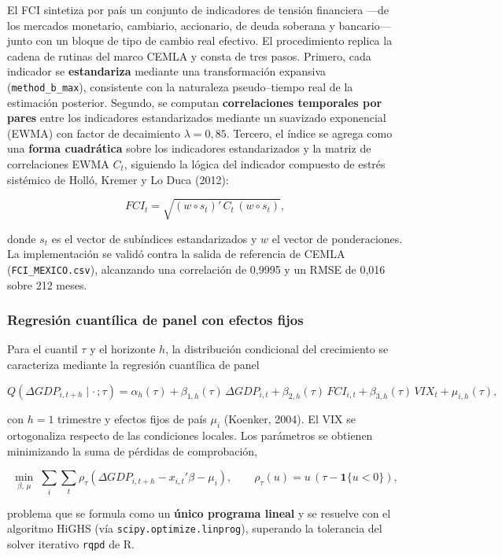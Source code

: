 \documentclass[5p,times,twocolumn,authoryear]{elsarticle}
\begin{document}
El FCI sintetiza por país un conjunto de indicadores de tensión financiera —de los mercados monetario, cambiario, accionario, de deuda soberana y bancario— junto con un bloque de tipo de cambio real efectivo. El procedimiento replica la cadena de rutinas del marco CEMLA y consta de tres pasos. Primero, cada indicador se \textbf{estandariza} mediante una transformación expansiva (\texttt{method\_b\_max}), consistente con la naturaleza pseudo–tiempo real de la estimación posterior. Segundo, se computan \textbf{correlaciones temporales por pares} entre los indicadores estandarizados mediante un suavizado exponencial (EWMA) con factor de decaimiento $\lambda = 0{,}85$. Tercero, el índice se agrega como una \textbf{forma cuadrática} sobre los indicadores estandarizados y la matriz de correlaciones EWMA $C_t$, siguiendo la lógica del indicador compuesto de estrés sistémico de Holló, Kremer y Lo Duca (2012):

\[ FCI_t = \sqrt{(w \circ s_t)'\,C_t\,(w \circ s_t)}, \]

donde $s_t$ es el vector de subíndices estandarizados y $w$ el vector de ponderaciones. La implementación se validó contra la salida de referencia de CEMLA (\texttt{FCI\_MEXICO.csv}), alcanzando una correlación de 0,9995 y un RMSE de 0,016 sobre 212 meses.

\subsubsection{Regresión cuantílica de panel con efectos fijos}

Para el cuantil $\tau$ y el horizonte $h$, la distribución condicional del crecimiento se caracteriza mediante la regresión cuantílica de panel

\[ Q\!\left(\Delta GDP_{i,t+h}\mid \cdot\,;\tau\right) = \alpha_h(\tau) + \beta_{1,h}(\tau)\,\Delta GDP_{i,t} + \beta_{2,h}(\tau)\,FCI_{i,t} + \beta_{3,h}(\tau)\,VIX_t + \mu_{i,h}(\tau), \]

con $h = 1$ trimestre y efectos fijos de país $\mu_i$ (Koenker, 2004). El VIX se ortogonaliza respecto de las condiciones locales. Los parámetros se obtienen minimizando la suma de pérdidas de comprobación,

\[ \min_{\beta,\,\mu}\;\sum_{i}\sum_{t}\rho_\tau\!\left(\Delta GDP_{i,t+h} - x_{i,t}'\beta - \mu_i\right), \qquad \rho_\tau(u) = u\,(\tau - \mathbf{1}\{u<0\}), \]

problema que se formula como un \textbf{único programa lineal} y se resuelve con el algoritmo HiGHS (vía \texttt{scipy.optimize.linprog}), superando la tolerancia del solver iterativo \texttt{rqpd} de R.
\end{document}
